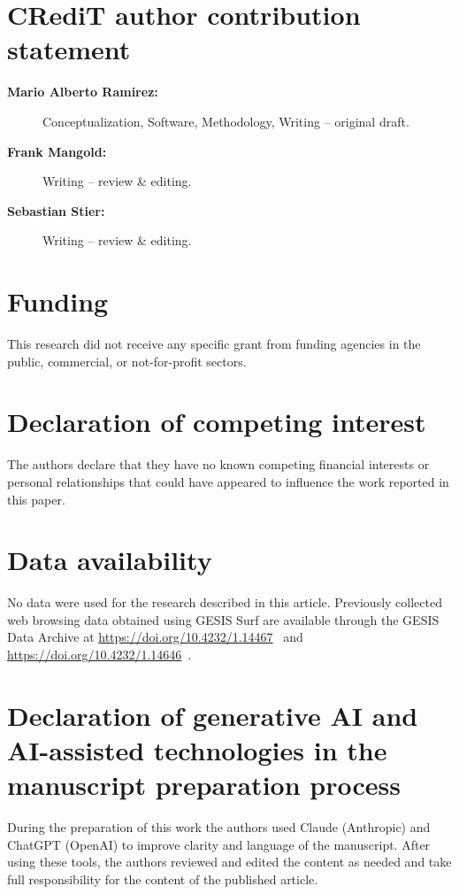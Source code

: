 \documentclass[preprint,12pt,a4paper]{elsarticle}
\begin{document}
  \section*{CRediT author contribution statement}
  \begin{description}
    \item[\textbf{Mario Alberto Ramirez:}] Conceptualization, Software, Methodology,
      Writing -- original draft.
    \item[\textbf{Frank Mangold:}] Writing -- review \& editing.
    \item[\textbf{Sebastian Stier:}] Writing -- review \& editing.
  \end{description}

  \section*{Funding}
  This research did not receive any specific grant from funding agencies in the public, commercial, or not-for-profit sectors.

  \section*{Declaration of competing interest}
  The authors declare that they have no known competing financial interests or personal relationships that could have appeared to influence the work reported in this paper.

\section*{Data availability}
No data were used for the research described in this article. Previously collected web browsing data obtained using GESIS Surf are available through the GESIS Data Archive at \url{https://doi.org/10.4232/1.14467}~\cite{gesis2025panel} and \url{https://doi.org/10.4232/1.14646}~\cite{gesis2025campus}.

  \section*{Declaration of generative AI and AI-assisted technologies in the manuscript preparation process}
  During the preparation of this work the authors used Claude (Anthropic) and ChatGPT (OpenAI) to improve clarity and language of the manuscript. After using these tools, the authors reviewed and edited the content as needed and take full responsibility for the content of the published article.

  
  
\end{document}
